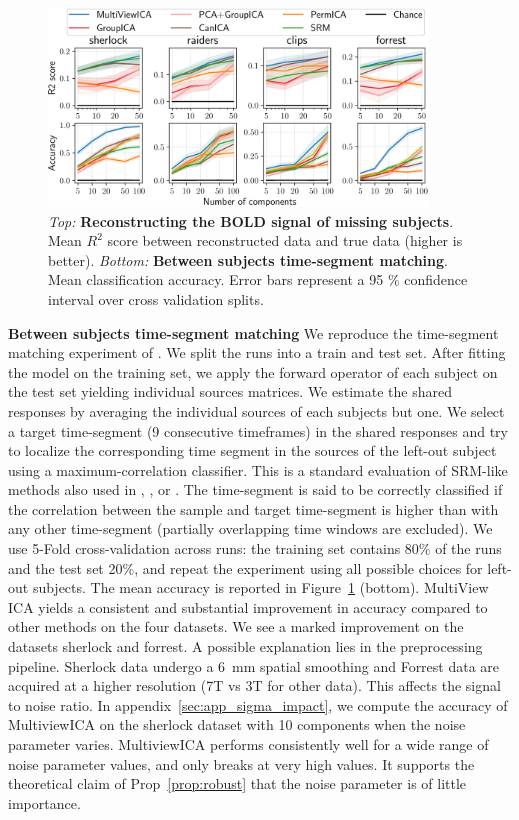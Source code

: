 \begin{figure}
  \centering
  \includegraphics[width=0.9\textwidth]{figures/mvica/timesegment_matching_reconstruction.pdf}
  \caption{\emph{Top:} \textbf{Reconstructing the BOLD signal of
      missing subjects}. Mean $R^2$ score between reconstructed data and true
    data (higher is better). \emph{Bottom:} \textbf{Between subjects time-segment matching}. Mean
    classification accuracy. Error bars represent a 95 \% confidence interval over cross validation splits.}
  \label{fig:reconstruction}
  \label{fig:timesegment}
\end{figure}


\textbf{Between subjects time-segment matching} 
We reproduce the time-segment matching experiment of
\cite{chen2015reduced}. 
We split the runs into a train and test set. After fitting the model on the training set, we apply the forward operator of each subject on the test set yielding individual sources matrices. We estimate the shared responses by averaging the individual sources of each subjects but one.  We select a target time-segment (9 consecutive timeframes) in the shared responses and try to localize the corresponding time segment in the sources of the left-out subject using a maximum-correlation classifier.
This is a standard evaluation of SRM-like methods also used in  \cite{chen2015reduced}, \cite{guntupalli2018computational}, \cite{Nastase741975} or
\cite{zhang2016searchlight}.
%
The time-segment is said to be
correctly classified if the correlation between the sample and target
time-segment is higher than with any other time-segment (partially overlapping time windows are excluded).
%
We use 5-Fold cross-validation across runs: the training set contains 80\% of the runs and the test set 20\%, and repeat the experiment using all possible choices for left-out subjects. 
%
The mean accuracy is reported in Figure~\ref{fig:timesegment} (bottom). 
%
MultiView ICA yields a consistent and substantial improvement in accuracy compared to other methods on the four datasets. We see a marked improvement on the datasets sherlock and forrest. A possible explanation lies in the preprocessing pipeline. Sherlock data undergo a 6~mm spatial smoothing and Forrest data are acquired at a higher resolution (7T vs 3T for other data). This affects the signal to noise ratio.
%
In appendix~\ref{sec:app_sigma_impact}, we compute the accuracy of MultiviewICA on the sherlock dataset with 10 components when the noise parameter varies. MultiviewICA performs consistently well for a wide range of noise parameter values, and only breaks at very high values. It supports the theoretical claim of Prop~\ref{prop:robust} that the noise parameter is of little importance.

